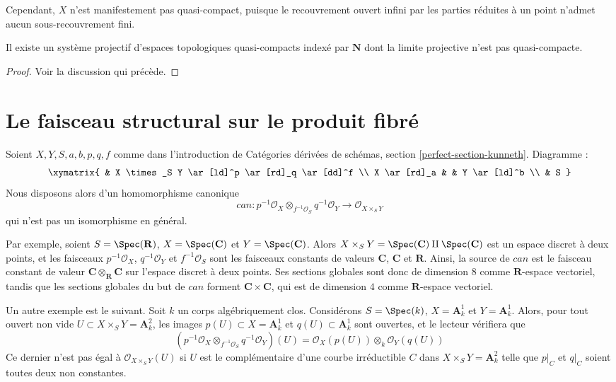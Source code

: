 \medskip\noindent
Cependant, $X$ n'est manifestement pas quasi-compact, puisque le recouvrement ouvert
infini par les parties réduites à un point n'admet aucun sous-recouvrement fini.

\begin{lemma}
\label{lemma-lim-not-quasi-compact}
Il existe un système projectif d'espaces topologiques quasi-compacts
indexé par $\mathbf{N}$ dont la limite projective n'est pas quasi-compacte.
\end{lemma}

\begin{proof}
Voir la discussion qui précède.
\end{proof}






\section{Le faisceau structural sur le produit fibré}
\label{section-silly}

\noindent
Soient $X, Y, S, a, b, p, q, f$ comme dans l'introduction de
Catégories dérivées de schémas,
section \ref{perfect-section-kunneth}. Diagramme :
$$
\xymatrix{
& X \times_S Y \ar[ld]^p \ar[rd]_q \ar[dd]^f \\
X \ar[rd]_a & & Y \ar[ld]^b \\
& S
}
$$
Nous disposons alors d'un homomorphisme canonique
$$
can :
p^{-1}\mathcal{O}_X \otimes_{f^{-1}\mathcal{O}_S} q^{-1}\mathcal{O}_Y
\longrightarrow
\mathcal{O}_{X \times_S Y}
$$
qui n'est pas un isomorphisme en général.

\medskip\noindent
Par exemple, soient $S = \Spec(\mathbf{R})$, $X = \Spec(\mathbf{C})$ et
$Y = \Spec(\mathbf{C})$. Alors
$X \times_S Y = \Spec(\mathbf{C}) \amalg \Spec(\mathbf{C})$
est un espace discret à deux points,
et les faisceaux $p^{-1}\mathcal{O}_X$, $q^{-1}\mathcal{O}_Y$
et $f^{-1}\mathcal{O}_S$ sont les faisceaux constants de valeurs
$\mathbf{C}$, $\mathbf{C}$ et $\mathbf{R}$.
Ainsi, la source de $can$ est le faisceau constant
de valeur $\mathbf{C} \otimes_\mathbf{R} \mathbf{C}$
sur l'espace discret à deux points. Ses sections
globales sont donc de dimension $8$ comme $\mathbf{R}$-espace vectoriel,
tandis que les sections globales du but de $can$
forment $\mathbf{C} \times \mathbf{C}$,
qui est de dimension $4$ comme $\mathbf{R}$-espace vectoriel.

\medskip\noindent
Un autre exemple est le suivant. Soit $k$ un corps algébriquement
clos. Considérons
$S = \Spec(k)$, $X = \mathbf{A}^1_k$ et $Y = \mathbf{A}^1_k$.
Alors, pour tout ouvert non vide $U \subset X \times_S Y = \mathbf{A}^2_k$,
les images $p(U) \subset X = \mathbf{A}^1_k$ et $q(U) \subset \mathbf{A}^1_k$
sont ouvertes, et le lecteur vérifiera que
$$
\left(
p^{-1}\mathcal{O}_X \otimes_{f^{-1}\mathcal{O}_S} q^{-1}\mathcal{O}_Y
\right)(U) = \mathcal{O}_X(p(U)) \otimes_k \mathcal{O}_Y(q(U))
$$
Ce dernier n'est pas égal à $\mathcal{O}_{X \times_S Y}(U)$
si $U$ est le complémentaire d'une courbe irréductible $C$ dans
$X \times_S Y = \mathbf{A}^2_k$ telle que $p|_C$ et $q|_C$
soient toutes deux non constantes.

